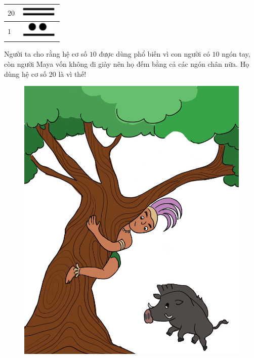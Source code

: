 \begin{multicols}{2}
\begin{table}[H]
\begin{tabular}{|l|c|}
			\hline
			$20$ & \includegraphics[scale=0.3]{35}\\
			\hline
			$1$& \includegraphics[scale=0.3]{36.png}\\
			\hline
		\end{tabular}
		\vspace*{-10pt}
	\end{table}
	Người ta cho rằng hệ cơ số $10$ được dùng phổ biến vì con người có $10$ ngón tay, còn người Maya vốn không đi giày nên họ đếm bằng cả các ngón chân nữa. Họ dùng hệ cơ số $20$ là vì thế!
	\begin{figure}[H]
		\centering
		\vspace*{-5pt}
		\captionsetup{labelformat= empty, justification=centering}
		\includegraphics[width=1\linewidth]{20.12-pi.4-2}
		\vspace*{-10pt}

\end{figure}
\end{multicols}
